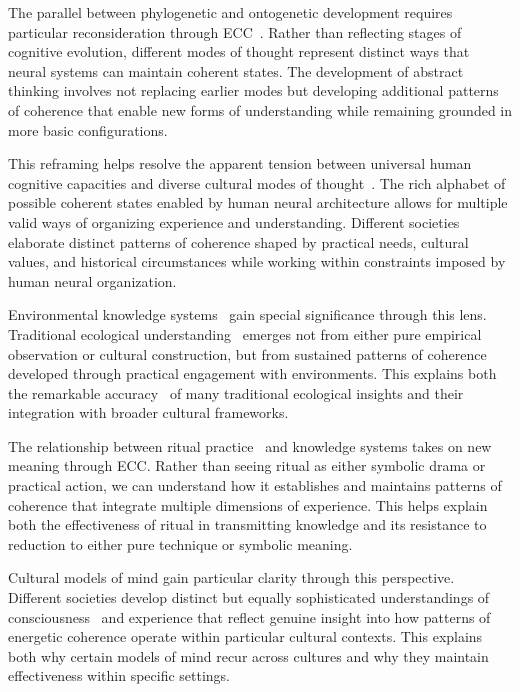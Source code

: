 The parallel between phylogenetic and ontogenetic development requires particular reconsideration through ECC~\cite{toren1999mind,csordas1994embodiment,piaget1971structuralism}. Rather than reflecting stages of cognitive evolution, different modes of thought represent distinct ways that neural systems can maintain coherent states. The development of abstract thinking involves not replacing earlier modes but developing additional patterns of coherence that enable new forms of understanding while remaining grounded in more basic configurations.

This reframing helps resolve the apparent tension between universal human cognitive capacities and diverse cultural modes of thought~\cite{strathern2004partial,descola2013beyond}. The rich alphabet of possible coherent states enabled by human neural architecture allows for multiple valid ways of organizing experience and understanding. Different societies elaborate distinct patterns of coherence shaped by practical needs, cultural values, and historical circumstances while working within constraints imposed by human neural organization.

Environmental knowledge systems~ gain special significance through this lens. Traditional ecological understanding~ emerges not from either pure empirical observation or cultural construction, but from sustained patterns of coherence developed through practical engagement with environments. This explains both the remarkable accuracy~ of many traditional ecological insights and their integration with broader cultural frameworks.

The relationship between ritual practice~ and knowledge systems takes on new meaning through ECC. Rather than seeing ritual as either symbolic drama or practical action, we can understand how it establishes and maintains patterns of coherence that integrate multiple dimensions of experience. This helps explain both the effectiveness of ritual in transmitting knowledge and its resistance to reduction to either pure technique or symbolic meaning.

Cultural models of mind gain particular clarity through this perspective. Different societies develop distinct but equally sophisticated understandings of consciousness~ and experience that reflect genuine insight into how patterns of energetic coherence operate within particular cultural contexts. This explains both why certain models of mind recur across cultures and why they maintain effectiveness within specific settings.

